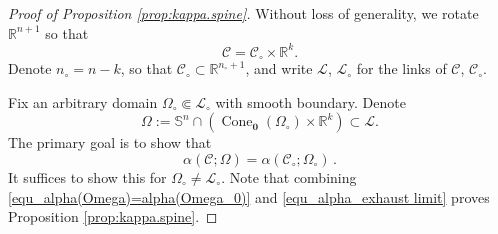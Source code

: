 \documentclass[10pt,a4paper]{amsart}
\newcommand{\RR}{\mathbb{R}}
\newcommand{\SSp}{\mathbb{S}}
\newcommand{\cC}{\mathcal{C}}
\newcommand{\cL}{\mathcal{L}}
\newcommand{\orig}{\mathbf{0}}
\begin{document}
\begin{proof}[Proof of Proposition \ref{prop:kappa.spine}]
	Without loss of generality, we rotate $\RR^{n+1}$ so that
	\[ \cC = \cC_\circ \times \RR^k. \]
	Denote $n_\circ = n - k$, so that $\cC_\circ \subset \RR^{n_\circ + 1}$, and write $\cL$, $\cL_\circ$ for the links of $\cC$, $\cC_\circ$. 
	
    Fix an arbitrary domain $\Omega_\circ \Subset  \cL_\circ$ with smooth boundary. Denote
    \[ \Omega:= \SSp^n\cap (\operatorname{Cone}_\orig(\Omega_\circ)\times\RR^k)\subset \cL. \]
    The primary goal is to show that 
    \begin{equation} \label{equ_alpha(Omega)=alpha(Omega_0)}
      \alpha(\cC; \Omega) = \alpha(\cC_\circ; \Omega_\circ)\,. 
    \end{equation}
    It suffices to show this for $\Omega_\circ \neq \cL_\circ$.
    Note that combining \eqref{equ_alpha(Omega)=alpha(Omega_0)} and \eqref{equ_alpha_exhaust limit} proves Proposition \ref{prop:kappa.spine}. 


\end{proof}
\end{document}
